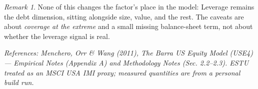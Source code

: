 \documentclass[11pt]{article}
\theoremstyle{definition}
\theoremstyle{plain}
\theoremstyle{remark}
\newtheorem*{remark}{Remark}
\begin{document}
\begin{remark}
None of this changes the factor's place in the model: Leverage remains the debt dimension, sitting alongside size, value, and the rest. The caveats are about \emph{coverage at the extreme} and a small missing balance-sheet term, not about whether the leverage signal is real.
\end{remark}

\begin{center}\small\itshape
References: Menchero, Orr \& Wang (2011), \textit{The Barra US Equity Model (USE4)} --- Empirical Notes (Appendix A) and Methodology Notes (Sec. 2.2--2.3). ESTU treated as an MSCI USA IMI proxy; measured quantities are from a personal build run.
\end{center}
\end{document}
